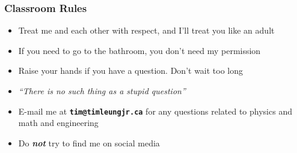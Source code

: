 \documentclass[12pt,compress,aspectratio=169]{beamer}
\begin{document}

\begin{frame}
  \frametitle{Classroom Rules}
  \begin{itemize}
  \item Treat me and each other with respect, and I'll treat you like an adult
  \item If you need to go to the bathroom, you don't need my permission
  \item Raise your hands if you have a question. Don't wait too long
  \item \emph{``There is no such thing as a stupid question''}
  \item E-mail me at \textbf{\texttt{tim@timleungjr.ca}} for any questions
    related to physics and math and engineering
  \item Do \textbf{\emph{not}} try to find me on social media
  \end{itemize}
\end{frame}

\begin{frame}
  \titlepage
\end{frame}
\end{document}
